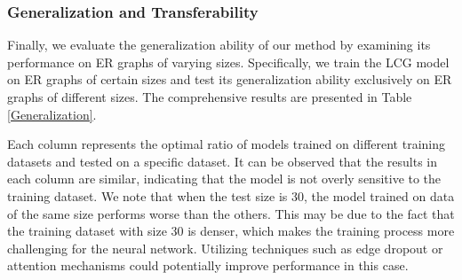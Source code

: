 \documentclass[a4paper,journal]{IEEEtran}
\begin{document}
\subsubsection{Generalization and Transferability}
{
Finally, we evaluate the generalization ability of our method by examining its performance on ER graphs of varying sizes. Specifically, we train the LCG model on ER graphs of certain sizes and test its generalization ability exclusively on ER graphs of different sizes. The comprehensive results are presented in Table \ref{Generalization}.
}

{
Each column represents the optimal ratio of models trained on different training datasets and tested on a specific dataset. It can be observed that the results in each column are similar, indicating that the model is not overly sensitive to the training dataset. We note that when the test size is 30, the model trained on data of the same size performs worse than the others. This may be due to the fact that the training dataset with size 30 is denser, which makes the training process more challenging for the neural network. Utilizing techniques such as edge dropout or attention mechanisms could potentially improve performance in this case.
}

\begin{table}[htbp]
	\centering
	\caption{Optimal ratio on graphs from different types and size graphs. Each dataset is filtered from 5000 test graphs by $\chi=7$.}
	\label{Generalization}
\end{table}
\end{document}
